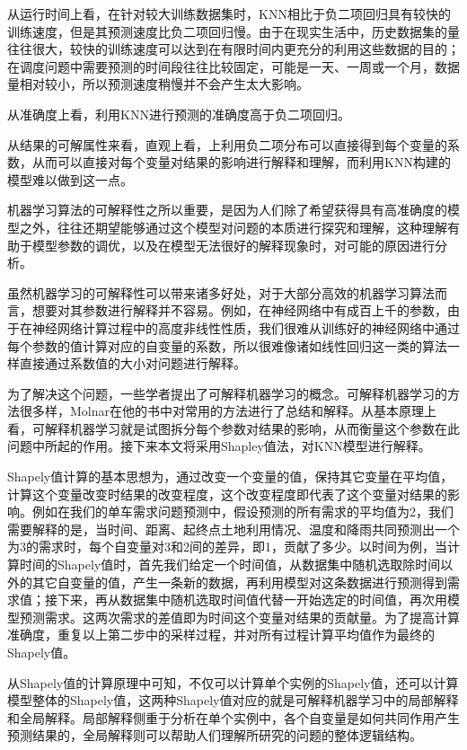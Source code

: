 \documentclass[]{tongjithesis}
\numberwithin{equation}{chapter}
\begin{document}
从运行时间上看，在针对较大训练数据集时，KNN相比于负二项回归具有较快的训练速度，但是其预测速度比负二项回归慢。由于在现实生活中，历史数据集的量往往很大，较快的训练速度可以达到在有限时间内更充分的利用这些数据的目的；在调度问题中需要预测的时间段往往比较固定，可能是一天、一周或一个月，数据量相对较小，所以预测速度稍慢并不会产生太大影响。

从准确度上看，利用KNN进行预测的准确度高于负二项回归。

从结果的可解属性来看，直观上看，上利用负二项分布可以直接得到每个变量的系数，从而可以直接对每个变量对结果的影响进行解释和理解，而利用KNN构建的模型难以做到这一点。

机器学习算法的可解释性之所以重要，是因为人们除了希望获得具有高准确度的模型之外，往往还期望能够通过这个模型对问题的本质进行探究和理解，这种理解有助于模型参数的调优，以及在模型无法很好的解释现象时，对可能的原因进行分析。

虽然机器学习的可解释性可以带来诸多好处，对于大部分高效的机器学习算法而言，想要对其参数进行解释并不容易。例如，在神经网络中有成百上千的参数，由于在神经网络计算过程中的高度非线性性质，我们很难从训练好的神经网络中通过每个参数的值计算对应的自变量的系数，所以很难像诸如线性回归这一类的算法一样直接通过系数值的大小对问题进行解释。

为了解决这个问题，一些学者提出了可解释机器学习的概念。可解释机器学习的方法很多样，Molnar在他的书中对常用的方法进行了总结和解释\cite{molnar2019}。从基本原理上看，可解释机器学习就是试图拆分每个参数对结果的影响，从而衡量这个参数在此问题中所起的作用。接下来本文将采用Shapley值法，对KNN模型进行解释。

Shapely值计算的基本思想为，通过改变一个变量的值，保持其它变量在平均值，计算这个变量改变时结果的改变程度，这个改变程度即代表了这个变量对结果的影响。例如在我们的单车需求问题预测中，假设预测的所有需求的平均值为2，我们需要解释的是，当时间、距离、起终点土地利用情况、温度和降雨共同预测出一个为3的需求时，每个自变量对3和2间的差异，即1，贡献了多少。以时间为例，当计算时间的Shapely值时，首先我们给定一个时间值，从数据集中随机选取除时间以外的其它自变量的值，产生一条新的数据，再利用模型对这条数据进行预测得到需求值；接下来，再从数据集中随机选取时间值代替一开始选定的时间值，再次用模型预测需求。这两次需求的差值即为时间这个变量对结果的贡献量。为了提高计算准确度，重复以上第二步中的采样过程，并对所有过程计算平均值作为最终的Shapely值。

从Shapely值的计算原理中可知，不仅可以计算单个实例的Shapely值，还可以计算模型整体的Shapely值，这两种Shapely值对应的就是可解释机器学习中的局部解释和全局解释。局部解释侧重于分析在单个实例中，各个自变量是如何共同作用产生预测结果的，全局解释则可以帮助人们理解所研究的问题的整体逻辑结构\cite{SHAPJO}。
\end{document}
